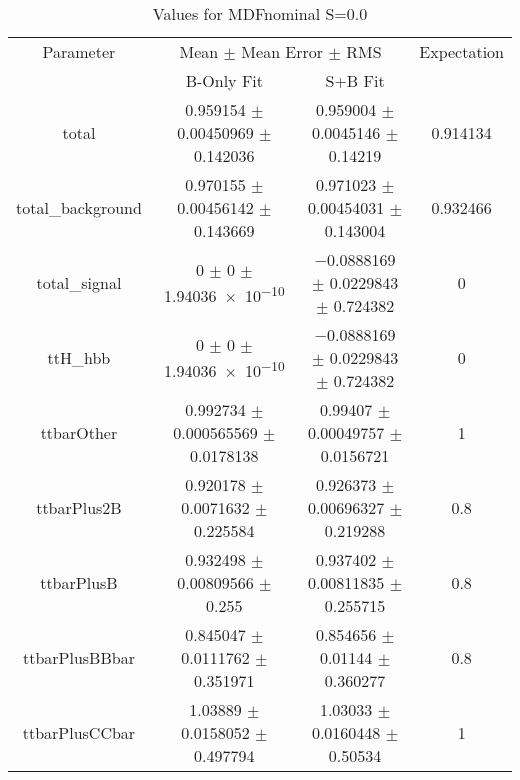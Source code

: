 \begin{table}
\centering
\caption{Values for MDFnominal S=0.0}
\begin{tabular}{cccc}
\toprule
Parameter & \multicolumn{2}{c}{Mean $\pm$ Mean Error $\pm$ RMS} & Expectation\\
 & B-Only Fit & S+B Fit & \\
\midrule
total & \num{0.959154} $\pm$ \num{0.00450969} $\pm$ \num{0.142036} & \num{0.959004} $\pm$ \num{0.0045146} $\pm$ \num{0.14219} & \num{0.914134}\\
total\_background & \num{0.970155} $\pm$ \num{0.00456142} $\pm$ \num{0.143669} & \num{0.971023} $\pm$ \num{0.00454031} $\pm$ \num{0.143004} & \num{0.932466}\\
total\_signal & \num{0} $\pm$ \num{0} $\pm$ \num{1.94036e-10} & \num{-0.0888169} $\pm$ \num{0.0229843} $\pm$ \num{0.724382} & \num{0}\\
ttH\_hbb & \num{0} $\pm$ \num{0} $\pm$ \num{1.94036e-10} & \num{-0.0888169} $\pm$ \num{0.0229843} $\pm$ \num{0.724382} & \num{0}\\
ttbarOther & \num{0.992734} $\pm$ \num{0.000565569} $\pm$ \num{0.0178138} & \num{0.99407} $\pm$ \num{0.00049757} $\pm$ \num{0.0156721} & \num{1}\\
ttbarPlus2B & \num{0.920178} $\pm$ \num{0.0071632} $\pm$ \num{0.225584} & \num{0.926373} $\pm$ \num{0.00696327} $\pm$ \num{0.219288} & \num{0.8}\\
ttbarPlusB & \num{0.932498} $\pm$ \num{0.00809566} $\pm$ \num{0.255} & \num{0.937402} $\pm$ \num{0.00811835} $\pm$ \num{0.255715} & \num{0.8}\\
ttbarPlusBBbar & \num{0.845047} $\pm$ \num{0.0111762} $\pm$ \num{0.351971} & \num{0.854656} $\pm$ \num{0.01144} $\pm$ \num{0.360277} & \num{0.8}\\
ttbarPlusCCbar & \num{1.03889} $\pm$ \num{0.0158052} $\pm$ \num{0.497794} & \num{1.03033} $\pm$ \num{0.0160448} $\pm$ \num{0.50534} & \num{1}\\
\bottomrule
\end{tabular}
\end{table}
